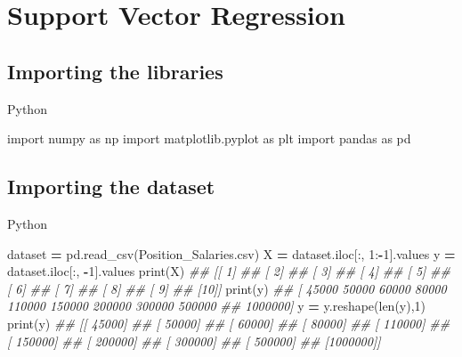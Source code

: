 \documentclass[
]{book}
\newenvironment{Shaded}{\begin{snugshade}}{\end{snugshade}}
\newcommand{\BuiltInTok}[1]{#1}
\newcommand{\CommentTok}[1]{\textcolor[rgb]{0.56,0.35,0.01}{\textit{#1}}}
\newcommand{\DecValTok}[1]{\textcolor[rgb]{0.00,0.00,0.81}{#1}}
\newcommand{\ImportTok}[1]{#1}
\newcommand{\NormalTok}[1]{#1}
\newcommand{\OperatorTok}[1]{\textcolor[rgb]{0.81,0.36,0.00}{\textbf{#1}}}
\newcommand{\StringTok}[1]{\textcolor[rgb]{0.31,0.60,0.02}{#1}}
\theoremstyle{definition}
\theoremstyle{definition}
\theoremstyle{definition}
\theoremstyle{definition}
\theoremstyle{remark}
\begin{document}
\hypertarget{support-vector-regression}{%
\section{Support Vector Regression}\label{support-vector-regression}}

\hypertarget{importing-the-libraries-4}{%
\subsection{Importing the libraries}\label{importing-the-libraries-4}}

Python

\begin{Shaded}
\begin{Highlighting}[]
\ImportTok{import}\NormalTok{ numpy }\ImportTok{as}\NormalTok{ np}
\ImportTok{import}\NormalTok{ matplotlib.pyplot }\ImportTok{as}\NormalTok{ plt}
\ImportTok{import}\NormalTok{ pandas }\ImportTok{as}\NormalTok{ pd}
\end{Highlighting}
\end{Shaded}

\hypertarget{importing-the-dataset-4}{%
\subsection{Importing the dataset}\label{importing-the-dataset-4}}

Python

\begin{Shaded}
\begin{Highlighting}[]
\NormalTok{dataset }\OperatorTok{=}\NormalTok{ pd.read\_csv(}\StringTok{\textquotesingle{}Position\_Salaries.csv\textquotesingle{}}\NormalTok{)}
\NormalTok{X }\OperatorTok{=}\NormalTok{ dataset.iloc[:, }\DecValTok{1}\NormalTok{:}\OperatorTok{{-}}\DecValTok{1}\NormalTok{].values}
\NormalTok{y }\OperatorTok{=}\NormalTok{ dataset.iloc[:, }\OperatorTok{{-}}\DecValTok{1}\NormalTok{].values}
\BuiltInTok{print}\NormalTok{(X)}
\CommentTok{\#\# [[ 1]}
\CommentTok{\#\#  [ 2]}
\CommentTok{\#\#  [ 3]}
\CommentTok{\#\#  [ 4]}
\CommentTok{\#\#  [ 5]}
\CommentTok{\#\#  [ 6]}
\CommentTok{\#\#  [ 7]}
\CommentTok{\#\#  [ 8]}
\CommentTok{\#\#  [ 9]}
\CommentTok{\#\#  [10]]}
\BuiltInTok{print}\NormalTok{(y)}
\CommentTok{\#\# [  45000   50000   60000   80000  110000  150000  200000  300000  500000}
\CommentTok{\#\#  1000000]}
\NormalTok{y }\OperatorTok{=}\NormalTok{ y.reshape(}\BuiltInTok{len}\NormalTok{(y),}\DecValTok{1}\NormalTok{)}
\BuiltInTok{print}\NormalTok{(y)}
\CommentTok{\#\# [[  45000]}
\CommentTok{\#\#  [  50000]}
\CommentTok{\#\#  [  60000]}
\CommentTok{\#\#  [  80000]}
\CommentTok{\#\#  [ 110000]}
\CommentTok{\#\#  [ 150000]}
\CommentTok{\#\#  [ 200000]}
\CommentTok{\#\#  [ 300000]}
\CommentTok{\#\#  [ 500000]}
\CommentTok{\#\#  [1000000]]}
\end{Highlighting}
\end{Shaded}
\end{document}
